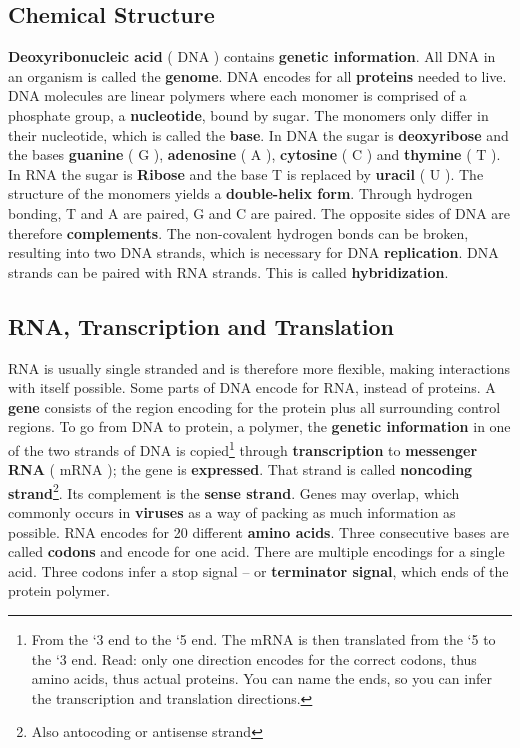 \documentclass[10pt,a4paper]{report}
\begin{document}
	\subsection{Chemical Structure}
	\textbf{Deoxyribonucleic acid} ( DNA ) contains \textbf{genetic information}. 
	All DNA in an organism is called the \textbf{genome}. 
	DNA encodes for all \textbf{proteins} needed to live. 
	DNA molecules are linear polymers where each monomer is comprised of a phosphate group, a \textbf{nucleotide}, bound by sugar. 
	The monomers only differ in their nucleotide, which is called the \textbf{base}. In DNA the sugar is \textbf{deoxyribose} and the bases \textbf{guanine} ( G ), \textbf{adenosine} ( A ), \textbf{cytosine} ( C ) and \textbf{thymine} ( T ). 
	In RNA the sugar is \textbf{Ribose} and the base T is replaced by \textbf{uracil} ( U ). 
	The structure of the monomers yields a \textbf{double-helix form}. 
	Through hydrogen bonding, T and A are paired, G and C are paired. 
	The opposite sides of DNA are therefore \textbf{complements}.  
	The non-covalent hydrogen bonds can be broken, resulting into two DNA strands, which is necessary for DNA \textbf{replication}. 
	DNA strands can be paired with RNA strands. This is called \textbf{hybridization}. 
	
	\subsection{RNA, Transcription and Translation}
	RNA is usually single stranded and is therefore more flexible, making interactions with itself possible. 
	Some parts of DNA encode for RNA, instead of proteins. 
	A \textbf{gene} consists of the region encoding for the protein plus all surrounding control regions. 
	To go from DNA to protein, a polymer, the \textbf{genetic information} in one of the two strands of DNA is copied\footnote{From the ‘3 end to the ‘5 end. The mRNA is then translated from the ‘5 to the ‘3 end.
	Read: only one direction encodes for the correct codons, thus amino acids, thus actual proteins. 
	You can name the ends, so you can infer the transcription and translation directions.}  through \textbf{transcription} to \textbf{messenger RNA} ( mRNA ); the gene is \textbf{expressed}. 
	That strand is called \textbf{noncoding strand}\footnote{Also antocoding or antisense strand}. 
	Its complement is the \textbf{sense strand}. 
	Genes may overlap, which commonly occurs in \textbf{viruses} as a way of packing as much information as possible. 
	RNA encodes for 20 different \textbf{amino acids}. 
	Three consecutive bases are called \textbf{codons} and encode for one acid. 
	There are multiple encodings for a single acid. 
	Three codons infer a stop signal – or \textbf{terminator signal}, which ends of the protein polymer.
	
\end{document}
